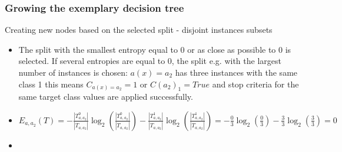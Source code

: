 \documentclass[smaller, proffesionalfonts]{beamer}
\begin{document}
\begin{frame}
\frametitle{Growing the exemplary decision tree}
\begin{block}{Creating new nodes based on the selected split - disjoint instances subsets}
\begin{itemize}
\item
\justifying
The split with the smallest entropy equal to 0 or as close as possible to 0 is selected. If several entropies are equal to 0, the split e.g. with the largest number of instances is chosen: $a(x)=a_2$ has three instances with the same class 1 this means $C_{a(x)=a_2}=1$ or $C(a_2)_1=True$ and stop criteria for the same target class values are applied successfully. 
\item 
$E_{a,a_2}(T)= 
-\frac{|T^{0}_{a,a_2}|}{|T_{a,a_2}|}\log_2(\frac{|T^{0}_{a,a_2}|}{|T_{a,a_2}|}) 
-\frac{|T^{1}_{a,a_2}|}{|T_{a,a_2}|}\log_2(\frac{|T^{1}_{a,a_2}|}{|T_{a,a_2}|}) =
-\frac{0}{3}\log_2(\frac{0}{3})-\frac{3}{3}\log_2(\frac{3}{3})=0$
\item[\ ]
\begin{minipage}[t]{.45\textwidth}
\hfill
\end{minipage}
\begin{minipage}[t]{.45\textwidth}
\end{minipage}
\end{itemize}
\end{block}
\end{frame}
\end{document}
